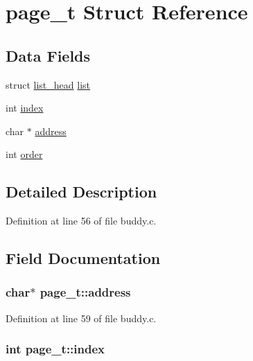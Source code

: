 \hypertarget{structpage__t}{}\section{page\+\_\+t Struct Reference}
\label{structpage__t}
\subsection*{Data Fields}
\begin{DoxyCompactItemize}
\item 
struct \hyperlink{structlist__head}{list\+\_\+head} \hyperlink{structpage__t_a97306c6fff4f6280e8e8049412091475}{list}
\item 
int \hyperlink{structpage__t_a006523076a191dd2fa60e23b2dfa6ef2}{index}
\item 
char $\ast$ \hyperlink{structpage__t_ada1e4cfdf91f322eb0bb3969bb1e2fa1}{address}
\item 
int \hyperlink{structpage__t_aeb4724e8b59033b5373a965e16ce86ad}{order}
\end{DoxyCompactItemize}


\subsection{Detailed Description}


Definition at line 56 of file buddy.\+c.



\subsection{Field Documentation}
\subsubsection[{\texorpdfstring{address}{address}}]{\setlength{\rightskip}{0pt plus 5cm}char$\ast$ page\+\_\+t\+::address}\hypertarget{structpage__t_ada1e4cfdf91f322eb0bb3969bb1e2fa1}{}\label{structpage__t_ada1e4cfdf91f322eb0bb3969bb1e2fa1}


Definition at line 59 of file buddy.\+c.

\subsubsection[{\texorpdfstring{index}{index}}]{\setlength{\rightskip}{0pt plus 5cm}int page\+\_\+t\+::index}\hypertarget{structpage__t_a006523076a191dd2fa60e23b2dfa6ef2}{}\label{structpage__t_a006523076a191dd2fa60e23b2dfa6ef2}


